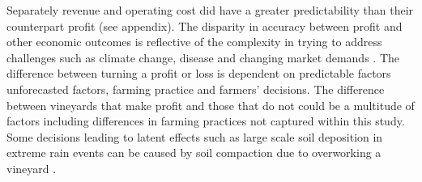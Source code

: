 \documentclass[review,12pt,authoryear]{elsarticle}
\begin{document}
\begin{linenumbers}







Separately revenue and operating cost did have a greater predictability than their counterpart profit (see appendix). The disparity in accuracy between profit and other economic outcomes is reflective of the complexity in trying to address challenges such as climate change, disease and changing market demands \citep{wineaustraliaNationalVintageReport2020,wineaustraliaNationalVintageReport2021,wineaustraliaNationalVintageReport2022}. The difference between turning a profit or loss is dependent on predictable factors unforecasted factors, farming practice and farmers' decisions. The difference between vineyards that make profit and those that do not could be a multitude of factors including differences in farming practices not captured within this study. Some decisions leading to latent effects such as large scale soil deposition in extreme rain events can be caused by soil compaction due to overworking a vineyard \citep{capelloPermanentCoverSoil2020}. 

\iffalse



\end{linenumbers}
\end{document}
